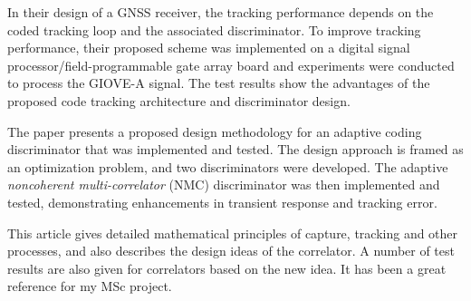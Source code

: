 In their design of a GNSS receiver, the tracking performance depends on the coded tracking loop and the associated discriminator. To improve tracking performance, their proposed scheme was implemented on a digital signal processor/field-programmable gate array board and experiments were conducted to process the GIOVE-A signal. The test results show the advantages of the proposed code tracking architecture and discriminator design.

The paper presents a proposed design methodology for an adaptive coding discriminator that was implemented and tested. The design approach is framed as an optimization problem, and two discriminators were developed. The adaptive \textit{noncoherent multi-correlator} (NMC) discriminator was then implemented and tested, demonstrating enhancements in transient response and tracking error.

This article gives detailed mathematical principles of capture, tracking and other processes, and also describes the design ideas of the correlator. A number of test results are also given for correlators based on the new idea. It has been a great reference for my MSc project.
